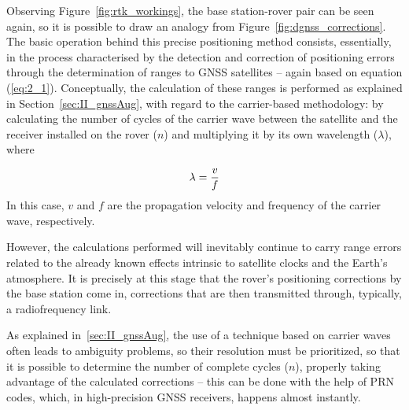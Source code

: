 Observing Figure~\ref{fig:rtk_workings}, the base station-rover pair can be seen again, so it is possible to draw an analogy from Figure~\ref{fig:dgnss_corrections}. The basic operation behind this precise positioning method consists, essentially, in the process characterised by the detection and correction of positioning errors through the determination of ranges to GNSS satellites -- again based on equation (\ref{eq:2_1}). Conceptually, the calculation of these ranges is performed as explained in Section~\ref{sec:II_gnssAug}, with regard to the carrier-based methodology: by calculating the number of cycles of the carrier wave between the satellite and the receiver installed on the rover ($n$) and multiplying it by its own wavelength ($\lambda$), where

\begin{equation}\label{eq:2_4}
    \lambda = \frac{v}{f}\medskip
\end{equation}
In this case, $v$ and $f$ are the propagation velocity and frequency of the carrier wave, respectively.

However, the calculations performed will inevitably continue to carry range errors related to the already known effects intrinsic to satellite clocks and the Earth's atmosphere. It is precisely at this stage that the rover's positioning corrections by the base station come in, corrections that are then transmitted through, typically, a radiofrequency link.

As explained in~\ref{sec:II_gnssAug}, the use of a technique based on carrier waves often leads to ambiguity problems, so their resolution must be prioritized, so that it is possible to determine the number of complete cycles ($n$), properly taking advantage of the calculated corrections -- this can be done with the help of PRN codes, which, in high-precision GNSS receivers, happens almost instantly.


